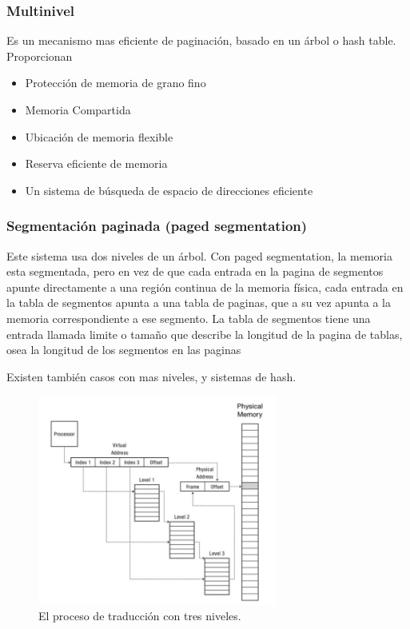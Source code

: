 \documentclass[titlepage,a4paper]{article}
\begin{document}
\newpage
\subsubsection*{Multinivel}
Es un mecanismo mas eficiente de paginación, basado en un árbol o hash table. Proporcionan
\begin{itemize}
    \item Protección de memoria de grano fino
    \item Memoria Compartida
    \item Ubicación de memoria flexible
    \item Reserva eficiente de memoria
    \item Un sistema de búsqueda de espacio de direcciones eficiente
\end{itemize}

\subsubsection*{Segmentación paginada (paged segmentation)}
Este sistema usa dos niveles de un árbol. Con paged segmentation, la memoria esta segmentada, pero en vez de que cada entrada en la pagina de segmentos apunte directamente a una región continua de la memoria física, cada entrada en la tabla de segmentos apunta a una tabla de paginas, que a su vez apunta a la memoria correspondiente a ese segmento. La tabla de segmentos tiene una entrada llamada limite o tamaño que describe la longitud de la pagina de tablas, osea la longitud de los segmentos en las paginas

Existen también casos con mas niveles, y sistemas de hash.

\begin{figure}[!htb]
    \centering
    \includegraphics[width=0.7\textwidth]{ImagenesApunte/address_translation_with_three_level.jpg}
    \caption{El proceso de traducción con tres niveles.}
\end{figure}
\end{document}
